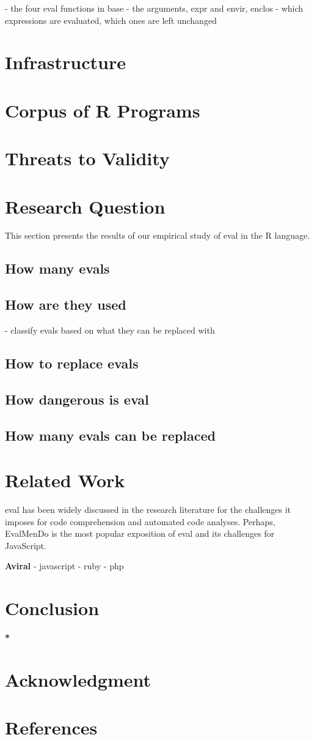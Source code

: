 \documentclass[conference]{IEEEtran}
\begin{document}
- the four eval functions in base
- the arguments, expr and envir, enclos
- which expressions are evaluated, which ones are left unchanged

\section{Infrastructure}


\section{Corpus of R Programs}


\section{Threats to Validity}


\section{Research Question}
This section presents the results of our empirical study of eval in the R language.
\subsection{How many evals}


\subsection{How are they used}

- classify evals based on what they can be replaced with



\subsection{How to replace evals}


\subsection{How dangerous is eval}

\subsection{How many evals can be replaced}

\section{Related Work}
eval has been widely discussed in the research literature for the challenges it
imposes for code comprehension and automated code analyses.
Perhaps, EvalMenDo is the most popular exposition of eval and its
challenges for JavaScript. 

\textbf{Aviral}
- javascript
- ruby
- php

\section{Conclusion}
\textbf{*}


\section*{Acknowledgment}

\section*{References}
\end{document}
